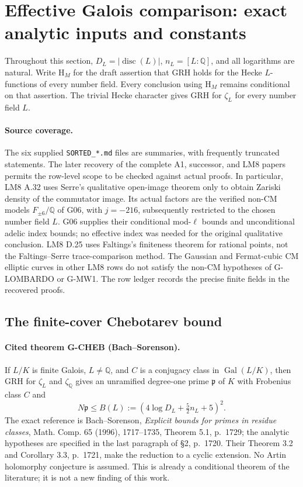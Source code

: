 \section{Effective Galois comparison: exact analytic inputs and constants}
\label{sec:effective-galois}

Throughout this section, $D_L=|\operatorname{disc}(L)|$, $n_L=[L:\mathbb Q]$, and all logarithms are natural.  Write $\mathrm{H}_M$ for the draft assertion that GRH holds for the Hecke $L$-functions of every number field.  Every conclusion using $\mathrm{H}_M$ remains conditional on that assertion.  The trivial Hecke character gives GRH for $\zeta_L$ for every number field $L$.

\paragraph{Source coverage.}
The six supplied \texttt{SORTED\_*.md} files are summaries, with frequently truncated statements.  The later recovery of the complete A1, successor, and LM8 papers permits the row-level scope to be checked against actual proofs.  In particular, LM8 A.32 uses Serre's qualitative open-image theorem only to obtain Zariski density of the commutator image.  Its actual factors are the verified non-CM models $F_{\pm6}/\mathbb Q$ of G06, with $j=-216$, subsequently restricted to the chosen number field $L$.  G06 supplies their conditional mod-$\ell$ bounds and unconditional adelic index bounds; no effective index was needed for the original qualitative conclusion.  LM8 D.25 uses Faltings's finiteness theorem for rational points, not the Faltings--Serre trace-comparison method.  The Gaussian and Fermat-cubic CM elliptic curves in other LM8 rows do not satisfy the non-CM hypotheses of G-LOMBARDO or G-MW1.  The row ledger records the precise finite fields in the recovered proofs.

\subsection{The finite-cover Chebotarev bound}

\paragraph{Cited theorem G-CHEB (Bach--Sorenson).}
If $L/K$ is finite Galois, $L\ne\mathbb Q$, and $C$ is a conjugacy class in $\operatorname{Gal}(L/K)$, then GRH for $\zeta_L$ and $\zeta_{\mathbb Q}$ gives an unramified degree-one prime $\mathfrak p$ of $K$ with Frobenius class $C$ and
\[
 N\mathfrak p\le B(L):=(4\log D_L+\tfrac52 n_L+5)^2.
\]
The exact reference is Bach--Sorenson, \emph{Explicit bounds for primes in residue classes}, Math. Comp. 65 (1996), 1717--1735, Theorem 5.1, p.~1729; the analytic hypotheses are specified in the last paragraph of \S2, p.~1720.  Their Theorem 3.2 and Corollary 3.3, p.~1721, make the reduction to a cyclic extension.  No Artin holomorphy conjecture is assumed.  This is already a conditional theorem of the literature; it is not a new finding of this work.

